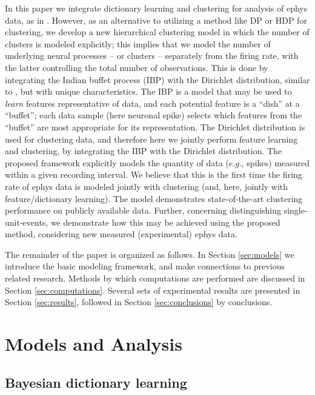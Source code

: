 \documentclass[journal]{IEEEtran}
\begin{document}
In this paper we integrate dictionary learning and clustering for analysis of ephys data, as in \cite{Dilan,Bo2011}. However, as an alternative to utilizing a method like DP or HDP \cite{Wood2009,Bo2011} for clustering, we develop a new hierarchical clustering model in which the number of clusters is modeled explicitly; this implies that we model the number of underlying neural processes -- or clusters -- separately from the firing rate, with the latter controlling the total number of observations. This is done by integrating the Indian buffet process (IBP) \cite{IBP} with the Dirichlet distribution, similar to \cite{compound}, but with unique characteristics. The IBP is a model that may be used to \emph{learn} features representative of data, and each potential feature is a ``dish'' at a ``buffet''; each data sample (here neuronal spike) selects which features from the ``buffet'' are most appropriate for its representation. The Dirichlet distribution is used for clustering data, and therefore here we jointly perform feature learning and clustering, by integrating the IBP with the Dirichlet distribution. The proposed framework explicitly models the quantity of data ($e.g.$, spikes) measured within a given recording interval. We believe that this is the first time the firing rate of ephys data is modeled jointly with clustering (and, here, jointly with feature/dictionary learning). The model demonstrates state-of-the-art clustering performance on publicly available data. Further, concerning distinguishing single-unit-events, we demonstrate how this may be achieved using the proposed method, considering new measured (experimental) ephys data.

The remainder of the paper is organized as follows. In Section \ref{sec:models} we introduce the basic modeling framework, and make connections to previous related research. Methods by which computations are performed are discussed in Section \ref{sec:computations}.
Several sets of experimental results are presented in Section \ref{sec:results}, followed in Section \ref{sec:conclusions} by conclusions.

\section{Models and Analysis\label{sec:models}}

\subsection{Bayesian dictionary learning\label{sec:dict}}
\end{document}
